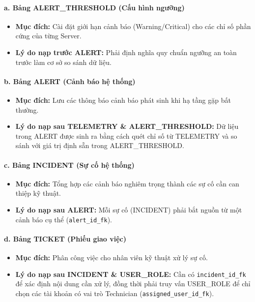 \paragraph{a. Bảng ALERT\_THRESHOLD (Cấu hình ngưỡng)}
\begin{itemize}
    \item \textbf{Mục đích:} Cài đặt giới hạn cảnh báo (Warning/Critical) cho các chỉ số phần cứng của từng Server.
    \item \textbf{Lý do nạp trước ALERT:} Phải định nghĩa quy chuẩn ngưỡng an toàn trước làm cơ sở so sánh dữ liệu.
\end{itemize}

\paragraph{b. Bảng ALERT (Cảnh báo hệ thống)}
\begin{itemize}
    \item \textbf{Mục đích:} Lưu các thông báo cảnh báo phát sinh khi hạ tầng gặp bất thường.
    \item \textbf{Lý do nạp sau TELEMETRY \& ALERT\_THRESHOLD:} Dữ liệu trong ALERT được sinh ra bằng cách quét chỉ số từ TELEMETRY và so sánh với giá trị định sẵn trong ALERT\_THRESHOLD.
\end{itemize}

\paragraph{c. Bảng INCIDENT (Sự cố hệ thống)}
\begin{itemize}
    \item \textbf{Mục đích:} Tổng hợp các cảnh báo nghiêm trọng thành các sự cố cần can thiệp kỹ thuật.
    \item \textbf{Lý do nạp sau ALERT:} Mỗi sự cố (INCIDENT) phải bắt nguồn từ một cảnh báo cụ thể (\texttt{alert\_id\_fk}).
\end{itemize}

\paragraph{d. Bảng TICKET (Phiếu giao việc)}
\begin{itemize}
    \item \textbf{Mục đích:} Phân công việc cho nhân viên kỹ thuật xử lý sự cố.
    \item \textbf{Lý do nạp sau INCIDENT \& USER\_ROLE:} Cần có \texttt{incident\_id\_fk} để xác định nội dung cần xử lý, đồng thời phải truy vấn USER\_ROLE để chỉ chọn các tài khoản có vai trò Technician (\texttt{assigned\_user\_id\_fk}).
\end{itemize}

